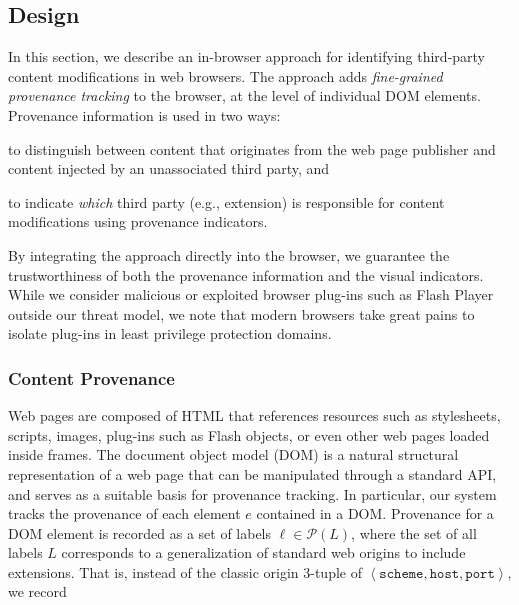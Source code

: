 \subsection{Design}
\label{adinjection:sec:design}

In this section, we describe an in-browser approach for identifying third-party
content modifications in web browsers. The approach adds \emph{fine-grained
provenance tracking} to the browser, at the level of individual DOM elements.
Provenance information is used in two ways:
\begin{inparaenum}
    \item to distinguish between content that originates from the web page
    publisher and content injected by an unassociated third party, and
    \item to indicate \emph{which} third party (e.g., extension) is responsible
    for content modifications using provenance indicators.
\end{inparaenum}
By integrating the approach directly into the browser, we guarantee the
trustworthiness of both the provenance information and the visual indicators.
While we consider malicious or exploited browser plug-ins such as Flash Player
outside our threat model, we note that modern browsers take great pains to
isolate plug-ins in least privilege protection domains.

\subsubsection{Content Provenance}
\label{adinjection:sec:design:provenance}



Web pages are composed of HTML that references resources such as stylesheets,
scripts, images, plug-ins such as Flash objects, or even other web pages loaded
inside frames. The document object model (DOM) is a natural structural
representation of a web page that can be manipulated through a standard API, and
serves as a suitable basis for provenance tracking. In particular, our system
tracks the provenance of each element \(e\) contained in a DOM. Provenance for a
DOM element is recorded as a set of labels \(\ell \in
\mathcal{P}\left(L\right)\), where the set of all labels \(L\) corresponds to a
generalization of standard web origins to include extensions. That is, instead
of the classic origin 3-tuple of \(\left\langle \texttt{scheme}, \texttt{host},
\texttt{port} \right\rangle\), we record


